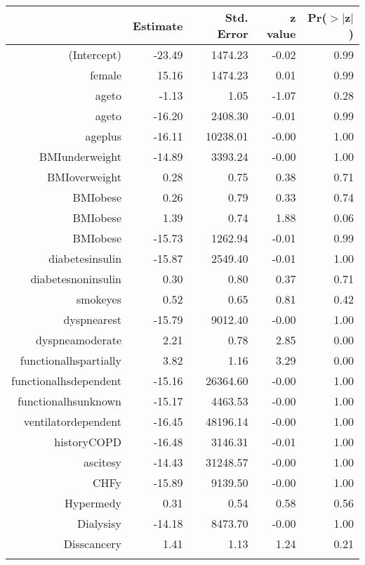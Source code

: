 \bigskip\bigskip
\centering
\begin{tabular}{rrrrr}
  \hline
 & Estimate & Std. Error & z value & Pr($>$$|$z$|$) \\ 
  \hline
(Intercept) & -23.49 & 1474.23 & -0.02 & 0.99 \\ 
  female & 15.16 & 1474.23 & 0.01 & 0.99 \\ 
  age\-65\-to\-74 & -1.13 & 1.05 & -1.07 & 0.28 \\ 
  age\-75\-to\-84 & -16.20 & 2408.30 & -0.01 & 0.99 \\ 
  age\-85\-plus & -16.11 & 10238.01 & -0.00 & 1.00 \\ 
  BMI\-underweight & -14.89 & 3393.24 & -0.00 & 1.00 \\ 
  BMI\-overweight & 0.28 & 0.75 & 0.38 & 0.71 \\ 
  BMI\-obese\-1 & 0.26 & 0.79 & 0.33 & 0.74 \\ 
  BMI\-obese\-2 & 1.39 & 0.74 & 1.88 & 0.06 \\ 
  BMI\-obese\-3 & -15.73 & 1262.94 & -0.01 & 0.99 \\ 
  diabetes\-insulin & -15.87 & 2549.40 & -0.01 & 1.00 \\ 
  diabetes\-noninsulin & 0.30 & 0.80 & 0.37 & 0.71 \\ 
  smoke\-yes & 0.52 & 0.65 & 0.81 & 0.42 \\ 
  dyspnea\-rest & -15.79 & 9012.40 & -0.00 & 1.00 \\ 
  dyspnea\-moderate & 2.21 & 0.78 & 2.85 & 0.00 \\ 
  functional\-hs\-partially & 3.82 & 1.16 & 3.29 & 0.00 \\ 
  functional\-hs\-dependent & -15.16 & 26364.60 & -0.00 & 1.00 \\ 
  functional\-hs\-unknown & -15.17 & 4463.53 & -0.00 & 1.00 \\ 
  ventilator\-dependent & -16.45 & 48196.14 & -0.00 & 1.00 \\ 
  history\-COPD & -16.48 & 3146.31 & -0.01 & 1.00 \\ 
  ascites\-y & -14.43 & 31248.57 & -0.00 & 1.00 \\ 
  CHF\-y & -15.89 & 9139.50 & -0.00 & 1.00 \\ 
  Hyper\-med\-y & 0.31 & 0.54 & 0.58 & 0.56 \\ 
  Dialysis\-y & -14.18 & 8473.70 & -0.00 & 1.00 \\ 
  Diss\-cancer\-y & 1.41 & 1.13 & 1.24 & 0.21 \\ 
$$
\end{tabular}

